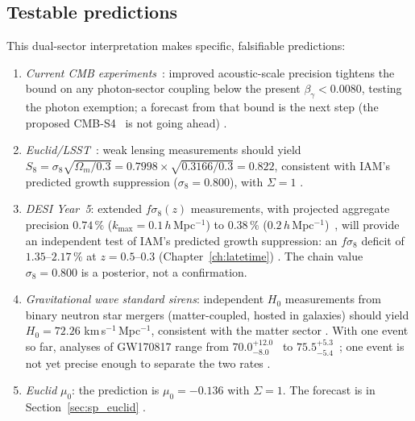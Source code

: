 \subsection{Testable predictions}\label{sec:dsv_predictions}
This dual-sector interpretation makes specific, falsifiable predictions:
\begin{enumerate}
\item \emph{Current CMB experiments}~\cite{Rosenberg2022,Aiola2020,Ade2019SO}: improved acoustic-scale precision tightens the bound on any photon-sector coupling below the present
$\beta_\gamma<0.0080$, testing the photon exemption; a forecast from that bound is the next step (the proposed CMB-S4~\cite{Abazajian2016} is not going ahead) \prediction.
\item \emph{Euclid/LSST}~\cite{Euclid2025,Ivezic2019}: weak lensing measurements should yield $S_8=\sigma_8\sqrt{\Omega_m/0.3}=0.7998\times\sqrt{0.3166/0.3}=0.822$,
consistent with IAM's predicted growth suppression ($\sigma_8=0.800$), with $\Sigma=1$ \prediction.
\item \emph{DESI Year~5}: extended $f\sigma_8(z)$ measurements, with projected aggregate precision $0.74\,\%$ ($k_{\max}=0.1\,h$\,Mpc$^{-1}$) to $0.38\,\%$
($0.2\,h$\,Mpc$^{-1}$)~\cite{DESI2016}, will provide an independent test of IAM's predicted growth suppression: an $f\sigma_8$ deficit of $1.35$--$2.17\,\%$ at
$z=0.5$--$0.3$ (Chapter~\ref{ch:latetime}) \prediction. The chain value $\sigma_8=0.800$ is a posterior, not a confirmation.
\item \emph{Gravitational wave standard sirens}: independent $H_0$ measurements from binary neutron star mergers (matter-coupled, hosted in galaxies)
should yield $H_0=72.26$ km\,s$^{-1}$\,Mpc$^{-1}$, consistent with the matter sector \prediction. With one event so far, analyses of GW170817 range from
$70.0^{+12.0}_{-8.0}$~\cite{Abbott2017Siren} to $75.5^{+5.3}_{-5.4}$~\cite{Palmese2024}; one event is not yet precise enough to separate the two rates \observed.
\item \emph{Euclid} $\mu_0$: the prediction is $\mu_0=-0.136$ with $\Sigma=1$. The forecast is in Section~\ref{sec:sp_euclid}
\prediction.
\end{enumerate}

